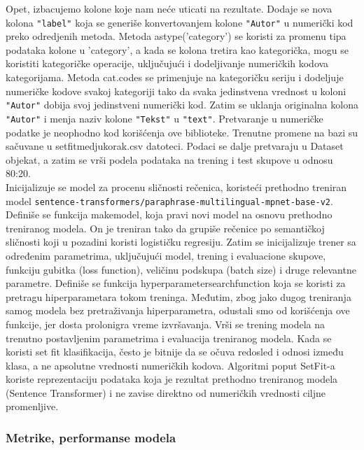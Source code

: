 \documentclass{article}
\begin{document}
\begin{flushleft}
Opet, izbacujemo kolone koje nam neće uticati na rezultate. Dodaje se nova kolona \texttt{"label"} koja se generiše konvertovanjem kolone \texttt{"Autor"} u numerički kod preko odredjenih metoda. Metoda astype('category') se koristi za promenu tipa podataka kolone u 'category', a kada se kolona tretira kao kategorička, mogu se koristiti kategoričke operacije, uključujući i dodeljivanje numeričkih kodova kategorijama. Metoda cat.codes se primenjuje na kategoričku seriju i dodeljuje numeričke kodove svakoj kategoriji tako da svaka jedinstvena vrednost u koloni \texttt{"Autor"} dobija svoj jedinstveni numerički kod. Zatim se uklanja originalna kolona \texttt{"Autor"} i menja naziv kolone \texttt{"Tekst"} u \texttt{"text"}. Pretvaranje u numeričke podatke je neophodno kod korišćenja ove biblioteke. Trenutne promene na bazi su sačuvane u setfit\textunderscore medjukorak.csv datoteci. Podaci se dalje pretvaraju u Dataset objekat, a zatim se vrši podela podataka na trening i test skupove u odnosu 80:20. \\Inicijalizuje se model za procenu sličnosti rečenica, koristeći prethodno treniran model \texttt{sentence-transformers/paraphrase-multilingual-mpnet-base-v2}. Definiše se funkcija make\textunderscore model, koja pravi novi model na osnovu prethodno treniranog modela. On je treniran tako da grupiše rečenice po semantičkoj sličnosti koji u pozadini koristi logističku regresiju. Zatim se inicijalizuje trener sa određenim parametrima, uključujući model, trening i evaluacione skupove, funkciju gubitka (loss function), veličinu podskupa (batch size) i druge relevantne parametre. Definiše se funkcija hyperparameter\textunderscore search\textunderscore function koja se koristi za pretragu hiperparametara tokom treninga. Međutim, zbog jako dugog treniranja samog modela bez pretraživanja hiperparametra, odustali smo od korišćenja ove funkcije, jer dosta prolonigra vreme izvršavanja. Vrši se trening modela na trenutno postavljenim parametrima i evaluacija treniranog
modela. Kada se koristi set fit klasifikacija, često je bitnije da se očuva redosled i odnosi između klasa, a ne apsolutne vrednosti numeričkih kodova. Algoritmi poput SetFit-a koriste reprezentaciju podataka koja je rezultat prethodno treniranog modela (Sentence Transformer) i ne zavise direktno od numeričkih vrednosti ciljne promenljive.


\vspace{2mm}
\subsubsection{Metrike, performanse modela} 


\end{flushleft}
\end{document}
